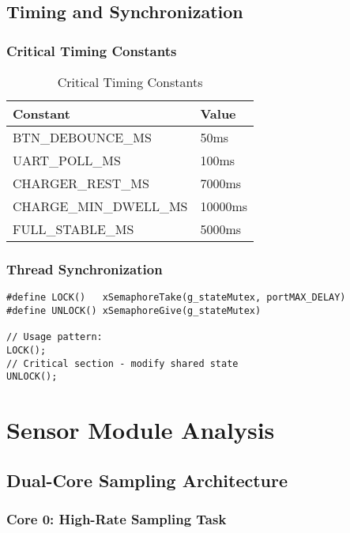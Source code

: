 \documentclass[11pt,a4paper]{article}
\begin{document}
\subsection{Timing and Synchronization}

\subsubsection{Critical Timing Constants}

\begin{table}[H]
\centering
\begin{tabular}{@{}ll@{}}
\toprule
Constant & Value \\ \midrule
BTN\_DEBOUNCE\_MS & 50ms \\
UART\_POLL\_MS & 100ms \\
CHARGER\_REST\_MS & 7000ms \\
CHARGE\_MIN\_DWELL\_MS & 10000ms \\
FULL\_STABLE\_MS & 5000ms \\ \bottomrule
\end{tabular}
\caption{Critical Timing Constants}
\end{table}

\subsubsection{Thread Synchronization}

\begin{lstlisting}[caption=Thread Synchronization Pattern]
#define LOCK()   xSemaphoreTake(g_stateMutex, portMAX_DELAY)
#define UNLOCK() xSemaphoreGive(g_stateMutex)

// Usage pattern:
LOCK();
// Critical section - modify shared state
UNLOCK();
\end{lstlisting}

\section{Sensor Module Analysis}

\subsection{Dual-Core Sampling Architecture}

\subsubsection{Core 0: High-Rate Sampling Task}
\end{document}

